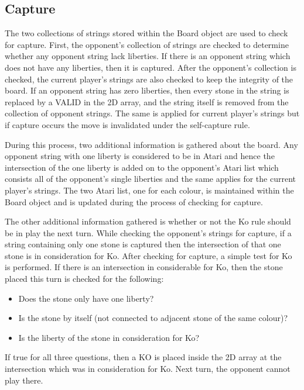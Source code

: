 \documentclass{l4proj}
\begin{document}
\subsection{Capture}
The two collections of strings stored within the Board object are used to check for capture. First, the opponent's collection of strings are checked to determine whether any opponent string lack liberties. If there is an opponent string which does not have any liberties, then it is captured. After the opponent's collection is checked, the current player's strings are also checked to keep the integrity of the board. If an opponent string has zero liberties, then every stone in the string is replaced by a VALID in the 2D array, and the string itself is removed from the collection of opponent strings. The same is applied for current player's strings but if capture occurs the move is invalidated under the self-capture rule.

During this process, two additional information is gathered about the board. Any opponent string with one liberty is considered to be in Atari and hence the intersection of the one liberty is added on to the opponent’s Atari list which consists all of the opponent’s single liberties and the same applies for the current player's strings. The two Atari list, one for each colour, is maintained within the Board object and is updated during the process of checking for capture.

The other additional information gathered is whether or not the Ko rule should be in play the next turn. While checking the opponent’s strings for capture, if a string containing only one stone is captured then the intersection of that one stone is in consideration for Ko. After checking for capture, a simple test for Ko is performed. If there is an intersection in considerable for Ko, then the stone placed this turn is checked for the following:

\begin{itemize}
    \item Does the stone only have one liberty?
    \item Is the stone by itself (not connected to adjacent stone of the same colour)?
    \item Is the liberty of the stone in consideration for Ko?
\end{itemize}

If true for all three questions, then a KO is placed inside the 2D array at the intersection which was in consideration for Ko. Next turn, the opponent cannot play there.
\end{document}
